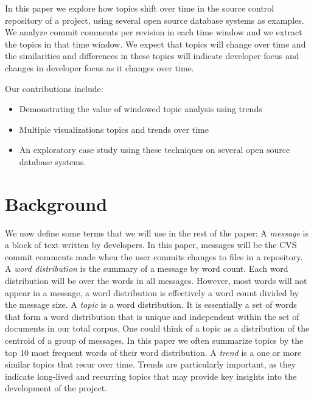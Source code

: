 \documentclass[times, 10pt,twocolumn]{article}
\newcommand{\shrinkit}{\vspace*{-.3em}}
\begin{document}
In this paper we explore how topics shift over time in the source
control repository of a project, using several open source database
systems as examples. We analyze commit comments per revision in each
time window and we extract the topics in that time window. We expect
that topics will change over time and the similarities
and differences in these topics will indicate developer
focus and changes in developer focus as it changes over time.

Our contributions include:
\begin{itemize}
\item Demonstrating the value of windowed topic analysis using trends
\item Multiple visualizations topics and trends over time
\item An exploratory case study using these techniques on several open source database systems.
\end{itemize}

\shrinkit
\section{Background}
\shrinkit


We now define some terms that we will use in the rest of the paper: A
\emph{message} is a block of text written by developers. In this
paper, messages will be the CVS commit comments made when the user
commits changes to files in a repository. A \emph{word distribution}
is the summary of a message by word count. Each word distribution will
be over the words in all messages. However, most words will not appear
in a message, a word distribution is effectively a word count divided
by the message size. A \emph{topic} is a word distribution. It is
essentially a set of words that form a word distribution that is
unique and independent within the set of documents in our total
corpus. One could think of a topic as a distribution of the centroid
of a group of messages. In this paper we often summarize topics by the
top 10 most frequent words of their word distribution.  A \emph{trend}
is a one or more similar topics that recur over time.  Trends are
particularly important, as they indicate long-lived and recurring
topics that may provide key insights into the development of the
project.

\end{document}
